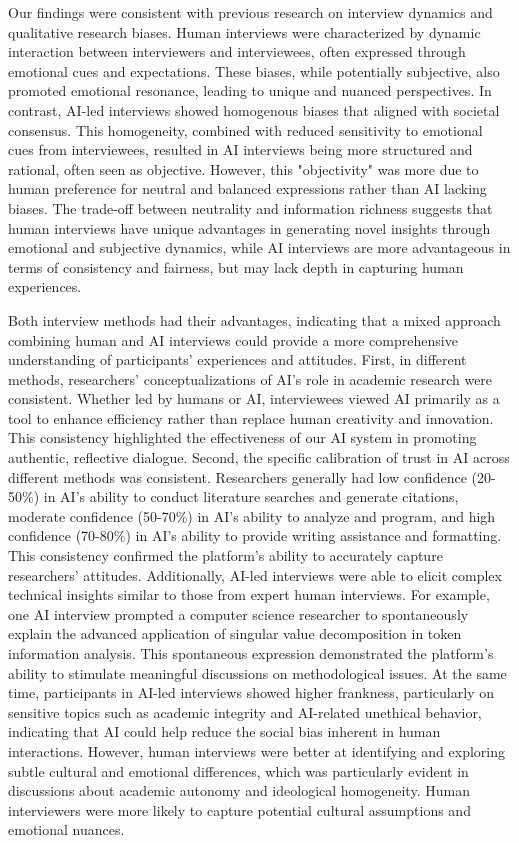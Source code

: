 \documentclass[sigchi,nonacm,manuscript]{acmart}
\begin{document}
Our findings were consistent with previous research on interview dynamics and qualitative research biases. Human interviews were characterized by dynamic interaction between interviewers and interviewees, often expressed through emotional cues and expectations. These biases, while potentially subjective, also promoted emotional resonance, leading to unique and nuanced perspectives\citep{adams-quackenbushInterviewExpectanciesAwareness2019}. In contrast, AI-led interviews showed homogenous biases that aligned with societal consensus\citep{timmonsCallActionAssessing2023}. This homogeneity, combined with reduced sensitivity to emotional cues from interviewees, resulted in AI interviews being more structured and rational, often seen as objective\citep{luoWhyMightAIenabled2025}. However, this "objectivity" was more due to human preference for neutral and balanced expressions rather than AI lacking biases. The trade-off between neutrality and information richness suggests that human interviews have unique advantages in generating novel insights through emotional and subjective dynamics, while AI interviews are more advantageous in terms of consistency and fairness, but may lack depth in capturing human experiences.

Both interview methods had their advantages, indicating that a mixed approach combining human and AI interviews could provide a more comprehensive understanding of participants' experiences and attitudes. First, in different methods, researchers' conceptualizations of AI's role in academic research were consistent. Whether led by humans or AI, interviewees viewed AI primarily as a tool to enhance efficiency rather than replace human creativity and innovation. This consistency highlighted the effectiveness of our AI system in promoting authentic, reflective dialogue. Second, the specific calibration of trust in AI across different methods was consistent. Researchers generally had low confidence (20-50\%) in AI's ability to conduct literature searches and generate citations, moderate confidence (50-70\%) in AI's ability to analyze and program, and high confidence (70-80\%) in AI's ability to provide writing assistance and formatting. This consistency confirmed the platform's ability to accurately capture researchers' attitudes. Additionally, AI-led interviews were able to elicit complex technical insights similar to those from expert human interviews. For example, one AI interview prompted a computer science researcher to spontaneously explain the advanced application of singular value decomposition in token information analysis. This spontaneous expression demonstrated the platform's ability to stimulate meaningful discussions on methodological issues. At the same time, participants in AI-led interviews showed higher frankness, particularly on sensitive topics such as academic integrity and AI-related unethical behavior, indicating that AI could help reduce the social bias inherent in human interactions. However, human interviews were better at identifying and exploring subtle cultural and emotional differences, which was particularly evident in discussions about academic autonomy and ideological homogeneity. Human interviewers were more likely to capture potential cultural assumptions and emotional nuances.
\end{document}
